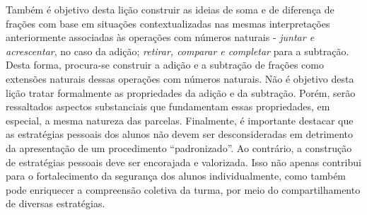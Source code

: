   Também é objetivo desta lição construir as ideias de soma e de diferença de frações com base em situações contextualizadas nas mesmas interpretações anteriormente associadas às operações com números naturais -   {\it juntar e acrescentar}, no caso da adição;    {\it retirar, comparar e completar}   para a subtração. Desta forma, procura-se construir a adição e a subtração de frações como extensões naturais dessas operações com números naturais. Não é objetivo desta lição tratar formalmente as propriedades da adição e da subtração. Porém, serão ressaltados aspectos substanciais que fundamentam essas propriedades, em especial, a mesma natureza das parcelas.
  Finalmente, é importante destacar que as estratégias pessoais dos alunos não devem ser desconsideradas em detrimento da apresentação de um procedimento   ``padronizado''. Ao contrário, a construção de estratégias pessoais deve ser encorajada e valorizada. Isso não apenas contribui para o fortalecimento da segurança dos alunos individualmente, como também pode enriquecer a compreensão coletiva da turma, por meio do compartilhamento de diversas estratégias.

